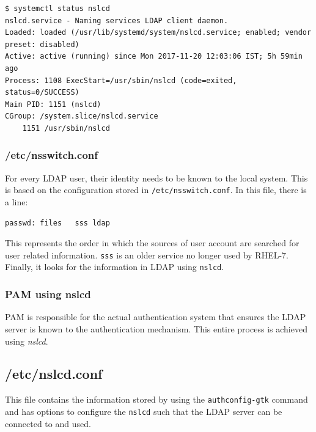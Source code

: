 \vspace{-15pt}
\begin{verbatim}
$ systemctl status nslcd
nslcd.service - Naming services LDAP client daemon.
Loaded: loaded (/usr/lib/systemd/system/nslcd.service; enabled; vendor preset: disabled)
Active: active (running) since Mon 2017-11-20 12:03:06 IST; 5h 59min ago
Process: 1108 ExecStart=/usr/sbin/nslcd (code=exited, status=0/SUCCESS)
Main PID: 1151 (nslcd)
CGroup: /system.slice/nslcd.service
	1151 /usr/sbin/nslcd
\end{verbatim}
\vspace{-10pt}

\subsubsection{/etc/nsswitch.conf}
For every LDAP user, their identity needs to be known to the local system. This is based on the configuration stored in \verb|/etc/nsswitch.conf|. In this file, there is a line:

\vspace{-15pt}
\begin{verbatim}
passwd:	files	sss	ldap
\end{verbatim}
\vspace{-10pt}

This represents the order in which the sources of user account are searched for user related information. \verb|sss| is an older service no longer used by RHEL-7. Finally, it looks for the information in LDAP using \verb|nslcd|.

\subsubsection{PAM using nslcd}
PAM is responsible for the actual authentication system that ensures the LDAP server is known to the authentication mechanism. This entire process is achieved using \textit{nslcd}. 

\subsection{/etc/nslcd.conf}
This file contains the information stored by using the \verb|authconfig-gtk| command and has options to configure the \verb|nslcd| such that the LDAP server can be connected to and used. 
	
